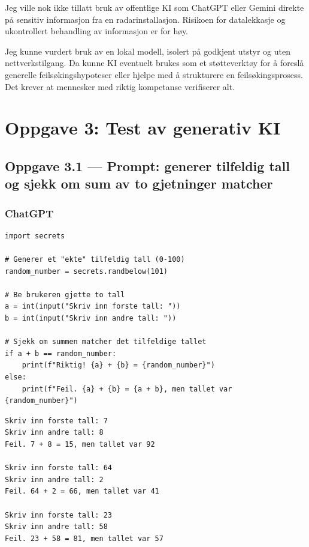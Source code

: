 \documentclass[12pt,a4paper]{article}
\begin{document}
Jeg ville nok ikke tillatt bruk av offentlige KI som ChatGPT eller Gemini direkte på sensitiv
informasjon fra en radarinstallasjon. Risikoen for datalekkasje og ukontrollert behandling av
informasjon er for høy.

Jeg kunne vurdert bruk av en lokal modell, isolert på godkjent utstyr og uten
nettverkstilgang. Da kunne KI eventuelt brukes som et støtteverktøy for å foreslå generelle
feilsøkingshypoteser eller hjelpe med å strukturere en feilsøkingsprosess. Det krever at
mennesker med riktig kompetanse verifiserer alt.

\section{Oppgave 3: Test av generativ KI}

\subsection*{Oppgave 3.1 --- Prompt: generer tilfeldig tall og sjekk om sum av to gjetninger matcher}

\subsubsection*{ChatGPT}

\begin{lstlisting}[style=python, caption={ChatGPT-kode}]
import secrets

# Generer et "ekte" tilfeldig tall (0-100)
random_number = secrets.randbelow(101)

# Be brukeren gjette to tall
a = int(input("Skriv inn forste tall: "))
b = int(input("Skriv inn andre tall: "))

# Sjekk om summen matcher det tilfeldige tallet
if a + b == random_number:
    print(f"Riktig! {a} + {b} = {random_number}")
else:
    print(f"Feil. {a} + {b} = {a + b}, men tallet var {random_number}")
\end{lstlisting}

\begin{lstlisting}[style=terminal, caption={Output fra ChatGPT-koden}]
Skriv inn forste tall: 7
Skriv inn andre tall: 8
Feil. 7 + 8 = 15, men tallet var 92

Skriv inn forste tall: 64
Skriv inn andre tall: 2
Feil. 64 + 2 = 66, men tallet var 41

Skriv inn forste tall: 23
Skriv inn andre tall: 58
Feil. 23 + 58 = 81, men tallet var 57
\end{lstlisting}
\end{document}
